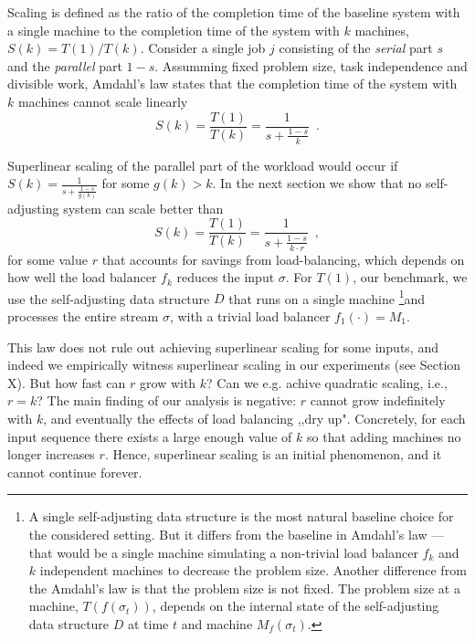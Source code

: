 Scaling is defined as the ratio of the completion time of the baseline system with a single machine to the completion time of the system with $k$ machines, $S(k) = T(1) / T(k)$.
Consider a single job $j$ consisting of the \emph{serial} part $s$ and the \emph{parallel} part $1-s$.
Assumming fixed problem size, task independence and divisible work, Amdahl's law states that the completion time of the system with $k$ machines cannot scale linearly
\begin{equation}\label{eq:mtf-perf}
  S(k) = \frac{T(1)}{T(k)} = \frac1{s + \frac{1-s}{k}} \enspace .
\end{equation}

Superlinear scaling of the parallel part of the workload would occur if $S(k) = \frac1{s + \frac{1-s}{g(k)}}$ for some $g(k) > k$.
In the next section we show that no self-adjusting system can scale better than
\begin{equation}\label{eq:mtf-perf}
  S(k) = \frac{T(1)}{T(k)} = \frac1{s + \frac{1-s}{k \cdot r}} \enspace ,
\end{equation}
for some value $r$ that accounts for savings from load-balancing, which depends on how well the load balancer $f_k$ reduces the input $\sigma$.
For $T(1)$, our benchmark, we use the self-adjusting data structure $D$ that runs on a single machine \footnote{A single self-adjusting data structure is the most natural baseline choice for the considered setting. But it differs from the baseline in Amdahl's law --- that would be a single machine simulating a non-trivial load balancer $f_k$ and $k$ independent machines to decrease the problem size. Another difference from the Amdahl's law is that the problem size is not fixed. The problem size at a machine, $T(f(\sigma_t))$, depends on the internal state of the self-adjusting data structure $D$ at time $t$ and machine $M_f(\sigma_t)$.}and processes the entire stream $\sigma$, with a trivial load balancer $f_1(\cdot) = M_1$.



This law does not rule out achieving superlinear scaling for some inputs, and indeed we empirically witness superlinear scaling in our experiments (see Section X).
But how fast can $r$ grow with $k$? Can we e.g. achive quadratic scaling, i.e., $r = k$?
The main finding of our analysis is negative: $r$ cannot grow indefinitely with $k$, and eventually the effects of load balancing ,,dry up". Concretely, for each input sequence there exists a large enough value of $k$ so that adding machines no longer increases $r$. Hence, superlinear scaling is an initial phenomenon, and it cannot continue forever.


